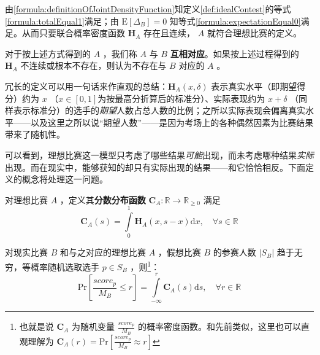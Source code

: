 \begin{definition}
\begin{asparaenum}[\bfseries{步骤} 1.]
                \end{asparaenum}

                由\eqref{formula:definitionOfJointDensityFunction}知定义\ref{def:idealContest}的等式\eqref{formula:totalEqual1}满足；由 $\mathrm{E}\left[\Delta_B\right]=0$ 知等式\eqref{formula:expectationEqual0}满足。从而只要联合概率密度函数 $\bm{H}_A$ 存在且连续， $A$ 就符合理想比赛的定义。

                对于按上述方式得到的 $A$ ，我们称 $A$ 与 $B$ \textbf{互相对应}。如果按上述过程得到的 $\bm{H}_A$ 不连续或根本不存在，则认为不存在与 $B$ 对应的 $A$ 。
                
                \label{def:realIdealCorrespondence}
            \end{definition}

            冗长的定义可以用一句话来作直观的总结：$\bm{H}_A\left(x,\delta\right)$ 表示真实水平（即期望得分）约为 $x$ （$x\in\left[0,1\right]$为按最高分折算后的标准分）、实际表现约为 $x+\delta$ （同样表示标准分）的选手的\emph{期望}人数占总人数的比例；之所以实际表现会偏离真实水平——以及这里之所以说“期望人数”——是因为考场上的各种偶然因素为比赛结果带来了随机性。

            可以看到，理想比赛这一模型只考虑了哪些结果\emph{可能}出现，而未考虑哪种结果\emph{实际}出现。而在现实中，能够获知的却只有实际出现的结果——和它恰恰相反。下面定义的概念将处理这一问题。

            \begin{definition}[分数分布函数]
                对理想比赛 $A$ ，定义其\textbf{分数分布函数} $\bm{C}_A:\mathbb{R}\to\mathbb{R}_{\geq 0}$ 满足
                $$
                \bm{C}_A(s)=\int\limits_{0}^1 \bm{H}_A(x,s-x) \mathrm{d}x,\quad\forall s\in\mathbb{R}
                $$

                \label{def:scoreDistribution}
            \end{definition}

            \begin{proposition}[分数分布函数的实际含义]
                对现实比赛 $B$ 和与之对应的理想比赛 $A$ ，假想比赛 $B$ 的参赛人数 $|S_B|$ 趋于无穷，等概率随机选取选手 $p\in S_B$ ，则\footnote{也就是说 $\bm{C}_A$ 为随机变量 $\frac{\textit{score}_p}{M_B}$ 的概率密度函数。和先前类似，这里也可以直观理解为 $\bm{C}_A(r)=\mathrm{Pr}\left[\frac{\textit{score}_p}{M_B}\approx r\right]$ }：
                $$
                \mathrm{Pr}\left[\frac{\textit{score}_p}{M_B}\leq r\right]=\int\limits_{-\infty}^r \bm{C}_A(s)\mathrm{d}s,\quad\forall r\in\mathbb{R}
                $$

                \label{prop:scoreDistributionMeaning}
            \end{proposition}

